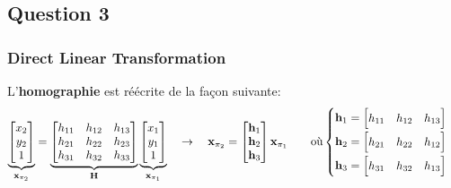 \documentclass[../CSC_5RO17_TA_TP1.tex]{subfiles}
\begin{document}
\subsection{Question 3}
\subsubsection{Direct Linear Transformation}
\noindent L'\textbf{homographie} est réécrite de la façon suivante:
\begin{equation*}
    \underbrace{
        \begin{bmatrix}
            x_{2}\\y_{2}\\1
        \end{bmatrix}
    }_{\mathbf{x}_{\pi_{2}}}
    =
    \underbrace{
        \begin{bmatrix}
            h_{11} & h_{12} & h_{13}\\
            h_{21} & h_{22} & h_{23}\\
            h_{31} & h_{32} & h_{33}\\
        \end{bmatrix}
    }_{\mathbf{H}}
    \underbrace{
        \begin{bmatrix}
            x_{1}\\y_{1}\\1
        \end{bmatrix}
    }_{\mathbf{x}_{\pi_{1}}}
    \quad\to\quad
    \mathbf{x}_{\pi_{2}} =
    \begin{bmatrix}
        \mathbf{h}_{1}\\\mathbf{h}_{2}\\\mathbf{h}_{3}\\
    \end{bmatrix}
    \mathbf{x}_{\pi_{1}}
    \qquad\text{où}
    \begin{cases}
        \mathbf{h}_1 = \begin{bmatrix}h_{11} & h_{12} & h_{13}\end{bmatrix}\vspace{1mm}\\
        \mathbf{h}_2 = \begin{bmatrix}h_{21} & h_{22} & h_{12}\end{bmatrix}\vspace{1mm}\\
        \mathbf{h}_3 = \begin{bmatrix}h_{31} & h_{32} & h_{13}\end{bmatrix}\\
    \end{cases}
\end{equation*}
\end{document}
